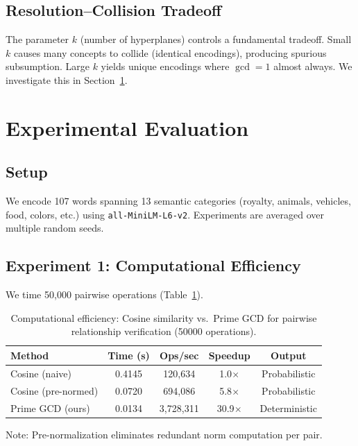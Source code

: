 \documentclass[10pt]{article}
\begin{document}
\subsection{Resolution--Collision Tradeoff}

The parameter $k$ (number of hyperplanes) controls a fundamental tradeoff. Small $k$ causes many concepts to collide (identical encodings), producing spurious subsumption. Large $k$ yields unique encodings where $\gcd = 1$ almost always. We investigate this in Section~\ref{sec:experiments}.

\section{Experimental Evaluation}
\label{sec:experiments}

\subsection{Setup}

We encode 107 words spanning 13 semantic categories (royalty, animals, vehicles, food, colors, etc.) using \texttt{all-MiniLM-L6-v2}. Experiments are averaged over multiple random seeds.

\subsection{Experiment 1: Computational Efficiency}

We time 50{,}000 pairwise operations (Table~\ref{tab:timing}).

\begin{table}[ht]
\centering
\caption{Computational efficiency: Cosine similarity vs.\ Prime GCD for pairwise relationship verification (50000 operations).}
\label{tab:timing}
\begin{tabular}{lcccc}
\toprule
Method & Time (s) & Ops/sec & Speedup & Output \\
\midrule
Cosine (naive) & 0.4145 & 120,634 & 1.0$\times$ & Probabilistic \\
Cosine (pre-normed) & 0.0720 & 694,086 & 5.8$\times$ & Probabilistic \\
Prime GCD (ours) & 0.0134 & 3,728,311 & 30.9$\times$ & Deterministic \\
\bottomrule
\end{tabular}
\vspace{2pt}
\small{Note: Pre-normalization eliminates redundant norm computation per pair.}
\end{table}
\end{document}
